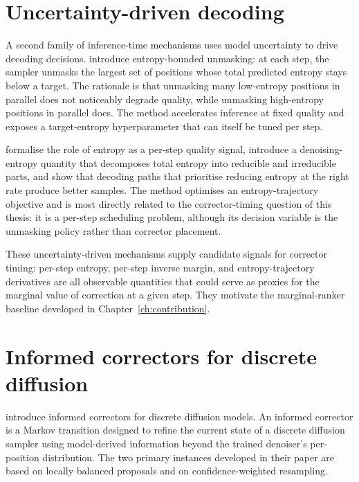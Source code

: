 \section{Uncertainty-driven decoding}
\label{lit:sec:uncertainty}

A second family of inference-time mechanisms uses model uncertainty to
drive decoding decisions. \textcite{benhamu2025ebsampler} introduce
entropy-bounded unmasking: at each step, the sampler unmasks the largest
set of positions whose total predicted entropy stays below a target. The
rationale is that unmasking many low-entropy positions in parallel does not
noticeably degrade quality, while unmasking high-entropy positions in
parallel does. The method accelerates inference at fixed quality and
exposes a target-entropy hyperparameter that can itself be tuned per step.

\textcite{chen2025denoisingentropy} formalise the role of entropy as a
per-step quality signal, introduce a denoising-entropy quantity that
decomposes total entropy into reducible and irreducible parts, and show
that decoding paths that prioritise reducing entropy at the right rate
produce better samples. The method optimises an entropy-trajectory
objective and is most directly related to the corrector-timing question
of this thesis: it is a per-step scheduling problem, although its decision
variable is the unmasking policy rather than corrector placement.

These uncertainty-driven mechanisms supply candidate signals for corrector
timing: per-step entropy, per-step inverse margin, and entropy-trajectory
derivatives are all observable quantities that could serve as proxies for
the marginal value of correction at a given step. They motivate the
marginal-ranker baseline developed in Chapter~\ref{ch:contribution}.

\section{Informed correctors for discrete diffusion}
\label{lit:sec:informed-correctors}

\textcite{zhao2024informedcorrectors} introduce informed correctors for
discrete diffusion models. An informed corrector is a Markov transition
designed to refine the current state of a discrete diffusion sampler using
model-derived information beyond the trained denoiser's per-position
distribution. The two primary instances developed in their paper are based
on locally balanced proposals \parencite{zanella2020informedproposals} and
on confidence-weighted resampling.


